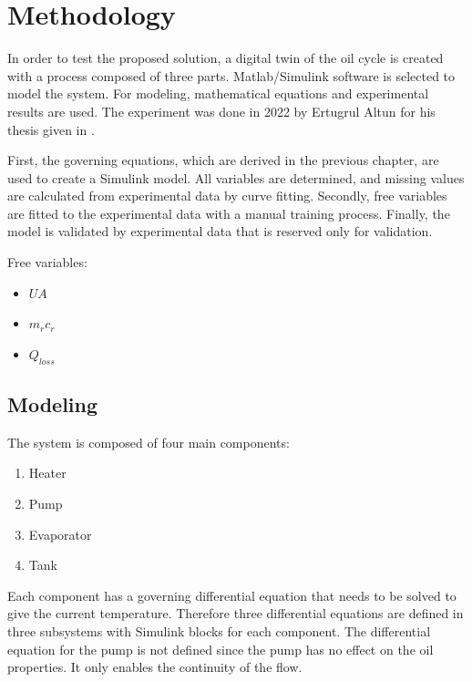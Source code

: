 \chapter{Methodology}

\par
In order to test the proposed solution, a digital twin of the oil cycle is created with a process composed of three parts. Matlab/Simulink software is selected to model the system. For modeling, mathematical equations\cite{gasomi} and experimental results are used. The experiment was done in 2022 by Ertugrul Altun for his thesis given in \cite{altun}. 
\par
First, the governing equations, which are derived in the previous chapter, are used to create a Simulink model. All variables are determined, and missing values are calculated from experimental data by curve fitting. Secondly, free variables are fitted to the experimental data with a manual training process. Finally, the model is validated by experimental data that is reserved only for validation.
\par
Free variables:
\begin{itemize}
    \item $UA$
    \item $m_{r}c_{r}$
    \item $Q_{loss}$
\end{itemize}

\section{Modeling}

The system is composed of four main components:

\begin{enumerate}
    \item Heater 
    \item Pump
    \item Evaporator
    \item Tank
\end{enumerate}

\par
Each component has a governing differential equation that needs to be solved to give the current temperature. Therefore three differential equations are defined in three subsystems with Simulink blocks for each component. The differential equation for the pump is not defined since the pump has no effect on the oil properties. It only enables the continuity of the flow. 

